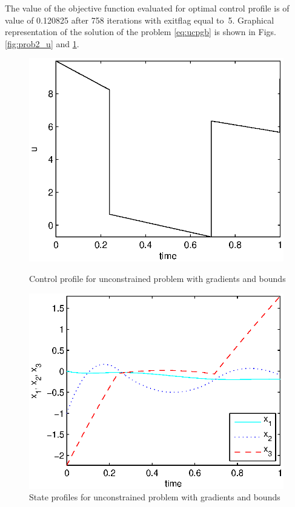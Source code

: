The value of the objective function evaluated for optimal control
profile is of value of 0.120825 after 758 iterations with exitflag
equal to~5. Graphical representation of the solution of the problem
\eqref{eq:ucpgb} is shown in Figs. \ref{fig:prob2_u} and
\ref{fig:prob2_x}.

\begin{figure}[htb]
\begin{minipage}[t]{0.5\linewidth}
\centering
\includegraphics[width=0.99\textwidth]{examples/problem2/graphs/u_624a.eps}
\caption[Tutorial example 3: control profile]{Control profile for
  unconstrained problem with gradients and bounds} \label{fig:prob2_u} 
\end{minipage}
\begin{minipage}[t]{0.5\linewidth}
\centering
\includegraphics[width=0.99\textwidth]{examples/problem2/graphs/x13_624a.eps}
\caption[Tutorial example 3: state profiles]{State profiles for
  unconstrained problem with gradients and bounds} \label{fig:prob2_x}
\end{minipage}
\end{figure}

